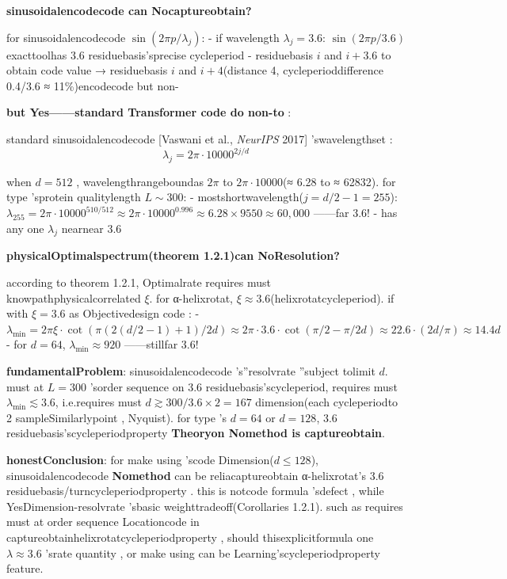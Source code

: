 \documentclass[
  12pt,
]{article}
\begin{document}
\textbf{ sinusoidalencodecode can Nocaptureobtain?}

for  sinusoidalencodecode  \(\sin(2\pi p / \lambda_j)\):  - if wavelength
\(\lambda_j = 3.6\): \(\sin(2\pi p/3.6)\) exacttoolhas  3.6 residuebasis'sprecise cycleperiod -
residuebasis \(i\) and  \(i+3.6\) to obtain code value  → residuebasis \(i\) and  \(i+4\)(distance
4, cycleperioddifference 0.4/3.6 ≈ 11\%)encodecode but non-

\textbf{but Yes------standard  Transformer code do non-to }: 

standard  sinusoidalencodecode  {[}Vaswani et al., \emph{NeurIPS} 2017{]} 'swavelengthset : 
\[\lambda_j = 2\pi \cdot 10000^{2j/d}\]

when  \(d = 512\) , wavelengthrangeboundas  \(2\pi\) to  \(2\pi \cdot 10000\)(≈ 6.28
to  ≈ 62832). for type 'sprotein qualitylength \(L \sim 300\):  -
mostshortwavelength(\(j = d/2-1 = 255\)):\(\lambda_{255} = 2\pi \cdot 10000^{510/512} \approx 2\pi \cdot 10000^{0.996} \approx 6.28 \times 9550 \approx 60,000\)
------far 3.6! - has any one  \(\lambda_j\) nearnear 3.6

\textbf{physicalOptimalspectrum(theorem  1.2.1)can NoResolution?}

according to theorem  1.2.1, Optimalrate requires must knowpathphysicalcorrelated  \(\xi\). for 
α-helixrotat, \(\xi \approx 3.6\)(helixrotatcycleperiod). if with  \(\xi = 3.6\)
as Objectivedesign code :  -
\(\lambda_{\min} = 2\pi\xi \cdot \cot(\pi(2(d/2-1)+1)/2d) \approx 2\pi \cdot 3.6 \cdot \cot(\pi/2 - \pi/2d) \approx 22.6 \cdot (2d/\pi) \approx 14.4 d\)
- for  \(d = 64\), \(\lambda_{\min} \approx 920\) ------stillfar 3.6!

\textbf{fundamentalProblem}:  sinusoidalencodecode 's''resolvrate ''subject tolimit \(d\). must at  \(L = 300\)
'sorder sequence on  3.6 residuebasis'scycleperiod, requires must 
\(\lambda_{\min} \lesssim 3.6\), i.e.requires must 
\(d \gtrsim 300/3.6 \times 2 = 167\) dimension(each cycleperiodto  2
sampleSimilarlypoint , Nyquist). for type 's \(d = 64\) or  \(d = 128\), 3.6
residuebasis'scycleperiodproperty \textbf{Theoryon Nomethod is captureobtain}. 

\textbf{honestConclusion}: for make using 'scode Dimension(\(d \leq 128\)),  sinusoidalencodecode \textbf{Nomethod }can be reliacaptureobtain
α-helixrotat's 3.6
residuebasis/turncycleperiodproperty . this is notcode formula 'sdefect , while YesDimension-resolvrate 'sbasic weighttradeoff(Corollaries
1.2.1). such as requires must at order sequence Locationcode in captureobtainhelixrotatcycleperiodproperty , should thisexplicitformula one 
\(\lambda \approx 3.6\) 'srate quantity , or make using can be Learning'scycleperiodproperty feature. 
\end{document}
